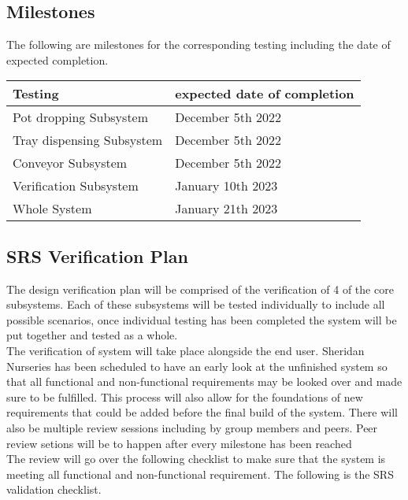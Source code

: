 \documentclass[12pt, titlepage]{article}
\begin{document}
\subsection{Milestones}
The following are milestones for the corresponding testing including the date of expected completion. 
\begin{center}
  \begin{tabular}{ |l|l| } 
    \hline
    \textbf{Testing} & \textbf{expected date of completion } \\ 
    \hline
    Pot dropping Subsystem    & December 5th 2022 \\
    Tray dispensing Subsystem & December 5th 2022 \\
    Conveyor Subsystem        & December 5th 2022 \\
    Verification Subsystem    & January 10th 2023 \\
    Whole System              & January 21th 2023 \\

    \hline
  \end{tabular}
\end{center}

\subsection{SRS Verification Plan}

The design verification plan will be comprised of the verification of 4 of the core subsystems.
 Each of these subsystems will be tested individually to include all possible scenarios, once 
 individual testing has been completed the system will be put together and tested as a whole.\\

The verification of system will take place alongside the end user. Sheridan Nurseries has been
 scheduled to have an early look at the unfinished system so that all functional and non-functional 
 requirements may be looked over and made sure to be fulfilled. This process will also allow for the 
 foundations of new requirements that could be added before the final build of the system. There will 
 also be multiple review sessions including by group members and peers. Peer review setions will be
 to happen after every milestone has been reached\\

The review will go over the following checklist to make sure that the system is meeting all functional 
and non-functional requirement. The following is the SRS validation checklist.
\end{document}
